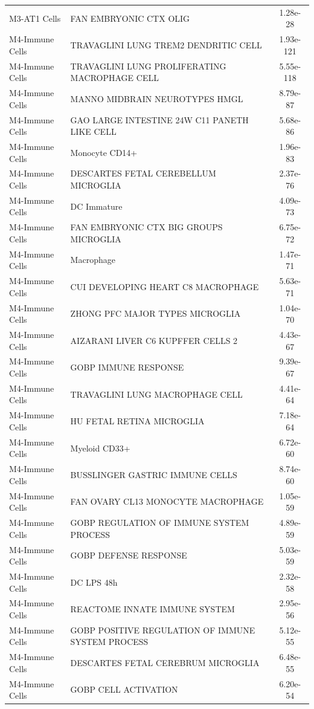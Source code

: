\documentclass[
]{article}
\begin{document}
\begin{singlespace}
\begin{longtable}[t]{>{\raggedright\arraybackslash}p{1.4in}>{\raggedright\arraybackslash}p{4.5in}c}
M3-AT1 Cells & FAN EMBRYONIC CTX OLIG & 1.28e-28\\
\addlinespace
M4-Immune Cells & TRAVAGLINI LUNG TREM2 DENDRITIC CELL & 1.93e-121\\
M4-Immune Cells & TRAVAGLINI LUNG PROLIFERATING MACROPHAGE CELL & 5.55e-118\\
M4-Immune Cells & MANNO MIDBRAIN NEUROTYPES HMGL & 8.79e-87\\
M4-Immune Cells & GAO LARGE INTESTINE 24W C11 PANETH LIKE CELL & 5.68e-86\\
M4-Immune Cells & Monocyte CD14+ & 1.96e-83\\
\addlinespace
M4-Immune Cells & DESCARTES FETAL CEREBELLUM MICROGLIA & 2.37e-76\\
M4-Immune Cells & DC Immature & 4.09e-73\\
M4-Immune Cells & FAN EMBRYONIC CTX BIG GROUPS MICROGLIA & 6.75e-72\\
M4-Immune Cells & Macrophage & 1.47e-71\\
M4-Immune Cells & CUI DEVELOPING HEART C8 MACROPHAGE & 5.63e-71\\
\addlinespace
M4-Immune Cells & ZHONG PFC MAJOR TYPES MICROGLIA & 1.04e-70\\
M4-Immune Cells & AIZARANI LIVER C6 KUPFFER CELLS 2 & 4.43e-67\\
M4-Immune Cells & GOBP IMMUNE RESPONSE & 9.39e-67\\
M4-Immune Cells & TRAVAGLINI LUNG MACROPHAGE CELL & 4.41e-64\\
M4-Immune Cells & HU FETAL RETINA MICROGLIA & 7.18e-64\\
\addlinespace
M4-Immune Cells & Myeloid CD33+ & 6.72e-60\\
M4-Immune Cells & BUSSLINGER GASTRIC IMMUNE CELLS & 8.74e-60\\
M4-Immune Cells & FAN OVARY CL13 MONOCYTE MACROPHAGE & 1.05e-59\\
M4-Immune Cells & GOBP REGULATION OF IMMUNE SYSTEM PROCESS & 4.89e-59\\
M4-Immune Cells & GOBP DEFENSE RESPONSE & 5.03e-59\\
\addlinespace
M4-Immune Cells & DC LPS 48h & 2.32e-58\\
M4-Immune Cells & REACTOME INNATE IMMUNE SYSTEM & 2.95e-56\\
M4-Immune Cells & GOBP POSITIVE REGULATION OF IMMUNE SYSTEM PROCESS & 5.12e-55\\
M4-Immune Cells & DESCARTES FETAL CEREBRUM MICROGLIA & 6.48e-55\\
M4-Immune Cells & GOBP CELL ACTIVATION & 6.20e-54\\

\end{longtable}
\end{singlespace}
\end{document}
